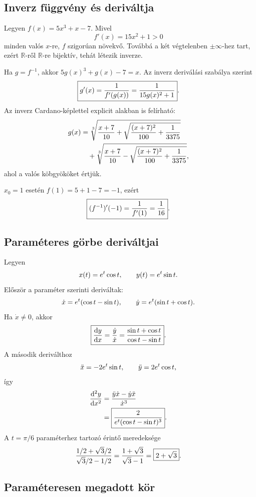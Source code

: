 \documentclass{szb-solution}
\begin{document}
\subsection{Inverz függvény és deriváltja}

Legyen $f(x)=5x^3+x-7$. Mivel
$$
  f'(x)=15x^2+1>0
$$
minden valós $x$-re, $f$ szigorúan növekvő. Továbbá a két végtelenben
$\pm\infty$-hez tart, ezért $\mathbb R$-ről $\mathbb R$-re bijektív, tehát
létezik inverze.

Ha $g=f^{-1}$, akkor $5g(x)^3+g(x)-7=x$. Az inverz deriválási szabálya
szerint
$$
  \boxed{g'(x)=\frac{1}{f'(g(x))}
  =\frac{1}{15g(x)^2+1}}
  \text.
$$
Az inverz Cardano-képlettel explicit alakban is felírható:
\begin{align*}
  g(x)
  &=\sqrt[3]{\frac{x+7}{10}
    +\sqrt{\frac{(x+7)^2}{100}+\frac1{3375}}}\\
  &\quad+\sqrt[3]{\frac{x+7}{10}
    -\sqrt{\frac{(x+7)^2}{100}+\frac1{3375}}}
  \text,
\end{align*}
ahol a valós köbgyököket értjük.

$x_0=1$ esetén $f(1)=5+1-7=-1$, ezért
$$
  \boxed{(f^{-1})'(-1)=\frac1{f'(1)}=\frac1{16}}
  \text.
$$

\subsection{Paraméteres görbe deriváltjai}

Legyen
$$
  x(t)=e^t\cos t,
  \qquad y(t)=e^t\sin t
  \text.
$$
Először a paraméter szerinti deriváltak:
$$
  \dot x=e^t(\cos t-\sin t),
  \qquad
  \dot y=e^t(\sin t+\cos t)
  \text.
$$
Ha $\dot x\neq0$, akkor
$$
  \boxed{
  \frac{\mathrm dy}{\mathrm dx}
  =\frac{\dot y}{\dot x}
  =\frac{\sin t+\cos t}{\cos t-\sin t}}
  \text.
$$
A második deriválthoz
$$
  \ddot x=-2e^t\sin t,
  \qquad
  \ddot y=2e^t\cos t
  \text,
$$
így
\begin{align*}
  \frac{\mathrm d^2y}{\mathrm dx^2}
  &=\frac{\ddot y\dot x-\dot y\ddot x}{\dot x^3}\\
  &=\boxed{\frac{2}{e^t(\cos t-\sin t)^3}}
  \text.
\end{align*}
A $t=\pi/6$ paraméterhez tartozó érintő meredeksége
$$
  \frac{1/2+\sqrt3/2}{\sqrt3/2-1/2}
  =\frac{1+\sqrt3}{\sqrt3-1}
  =\boxed{2+\sqrt3}
  \text.
$$

\subsection{Paraméteresen megadott kör}
\end{document}
